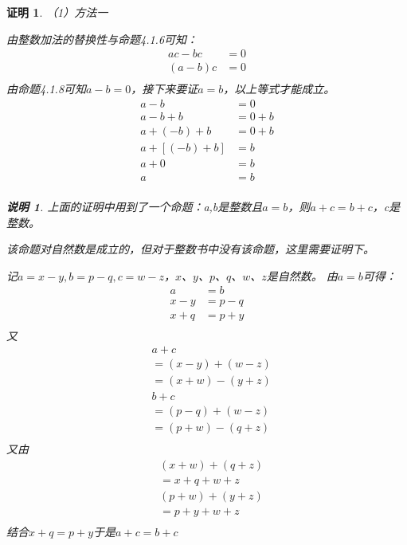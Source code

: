 \documentclass{article}
\theoremstyle{mystyle}
\newtheorem*{zremark}{说明}
\theoremstyle{zproofstyle}
\newtheorem*{zproof}{证明}
\begin{document}
\begin{zproof}
  （1）方法一

  由整数加法的替换性与命题4.1.6可知：
  \begin{align*}
    ac - bc & = 0 \\
    (a-b) c & = 0 \\
  \end{align*}
  由命题4.1.8可知$a-b=0$，接下来要证$a=b$，以上等式才能成立。
  \begin{align*}
    a - b           & = 0     \\
    a - b + b       & = 0 + b \\
    a + (- b) + b   & = 0 + b \\
    a + [(- b) + b] & = b     \\
    a + 0           & = b     \\
    a               & = b     \\
  \end{align*}

  \begin{zgraytheorem}
    \begin{zremark}
      上面的证明中用到了一个命题：a,b是整数且$a=b$，则$a+c=b+c$，c是整数。

      该命题对自然数是成立的，但对于整数书中没有该命题，这里需要证明下。

      记$a=x-y,b=p-q,c=w-z$，$x$、$y$、$p$、$q$、$w$、$z$是自然数。
      由$a=b$可得：
      \begin{align*}
        a     & = b     \\
        x - y & = p - q \\
        x + q & = p + y \\
      \end{align*}
      又
      \begin{align*}
         & a + c               \\
         & = (x - y) + (w - z) \\
         & = (x + w) - (y + z) \\
         & b + c               \\
         & = (p - q) + (w - z) \\
         & = (p + w) - (q + z) \\
      \end{align*}
      又由
      \begin{align*}
         & (x + w) + (q + z) \\
         & = x + q + w + z   \\
         & (p + w) + (y + z) \\
         & = p + y + w + z   \\
      \end{align*}
      结合$x + q = p + y$于是$a+c=b+c$
    \end{zremark}
  \end{zgraytheorem}


\end{zproof}
\end{document}
